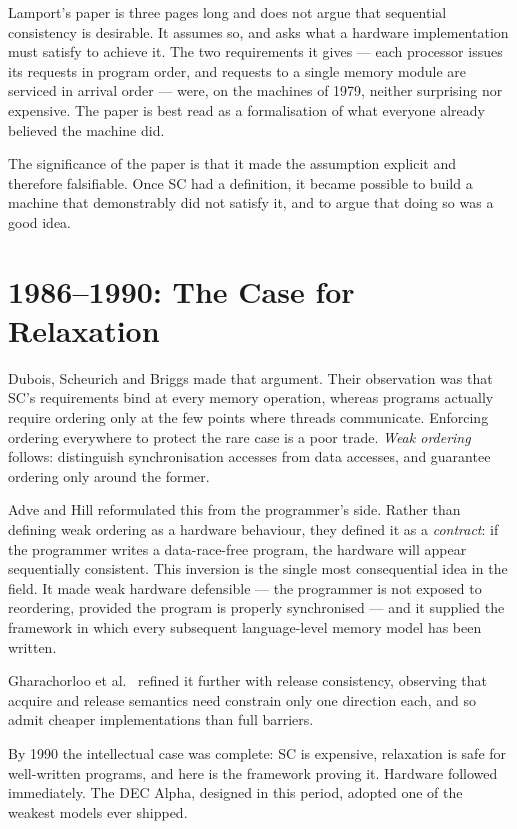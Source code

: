 Lamport's paper \cite{lamport1979multiprocessor} is three pages long and does not
argue that sequential consistency is desirable.
It assumes so, and asks what a
hardware implementation must satisfy to achieve it.
The two requirements it gives
--- each processor issues its requests in program order, and requests to a single
memory module are serviced in arrival order --- were, on the machines of 1979,
neither surprising nor expensive.
The paper is best read as a formalisation of
what everyone already believed the machine did.

The significance of the paper is that it made the assumption explicit and therefore
falsifiable.
Once SC had a definition, it became possible to build a machine that
demonstrably did not satisfy it, and to argue that doing so was a good idea.

\section{1986--1990: The Case for Relaxation}

Dubois, Scheurich and Briggs \cite{dubois1986memory} made that argument.
Their
observation was that SC's requirements bind at every memory operation, whereas
programs actually require ordering only at the few points where threads
communicate.
Enforcing ordering everywhere to protect the rare case is a poor
trade.
\emph{Weak ordering} follows: distinguish synchronisation accesses from
data accesses, and guarantee ordering only around the former.

Adve and Hill \cite{adve1990weak} reformulated this from the programmer's side.
Rather than defining weak ordering as a hardware behaviour, they defined it as a
\emph{contract}: if the programmer writes a data-race-free program, the hardware
will appear sequentially consistent.
This inversion is the single most consequential
idea in the field.
It made weak hardware defensible --- the programmer is not
exposed to reordering, provided the program is properly synchronised --- and it
supplied the framework in which every subsequent language-level memory model has
been written.

Gharachorloo et al.\ \cite{gharachorloo1990memory} refined it further with release
consistency, observing that acquire and release semantics need constrain only one
direction each, and so admit cheaper implementations than full barriers.

By 1990 the intellectual case was complete: SC is expensive, relaxation is safe for
well-written programs, and here is the framework proving it.
Hardware followed
immediately.
The DEC Alpha, designed in this period, adopted one of the weakest
models ever shipped.

